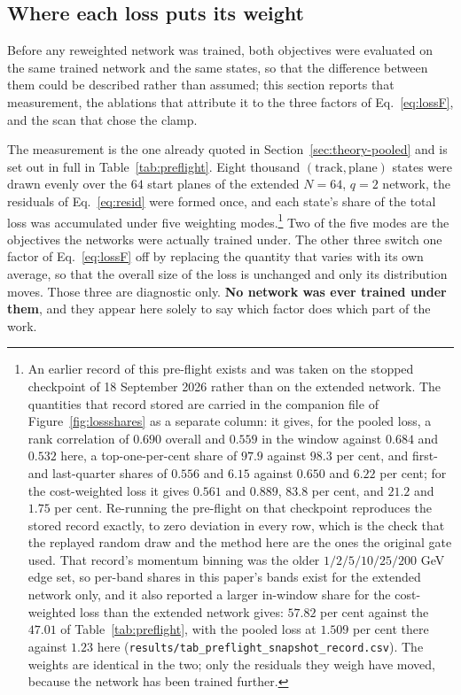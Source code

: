 \documentclass[11pt,a4paper]{article}
\begin{document}
\subsection{Where each loss puts its weight}
\label{sec:results-weight}

Before any reweighted network was trained, both objectives were evaluated on
the same trained network and the same states, so that the difference between
them could be described rather than assumed; this section reports that
measurement, the ablations that attribute it to the three factors of
Eq.~\eqref{eq:lossF}, and the scan that chose the clamp.

The measurement is the one already quoted in Section~\ref{sec:theory-pooled}
and is set out in full in Table~\ref{tab:preflight}. Eight thousand
$(\text{track}, \text{plane})$ states were drawn evenly over the $64$ start
planes of the extended $N = 64$, $q = 2$ network, the residuals of
Eq.~\eqref{eq:resid} were formed once, and each state's share of the total
loss was accumulated under five weighting modes.\footnote{An earlier record of
this pre-flight exists and was taken on the stopped checkpoint of 18 September
2026 rather than on the extended network. The quantities that record stored are
carried in the companion file of Figure~\ref{fig:lossshares} as a separate
column: it gives, for the pooled loss, a rank correlation of $0.690$ overall
and $0.559$ in the window against $0.684$ and $0.532$ here, a top-one-per-cent
share of $97.9$ against $98.3$ per cent, and first- and last-quarter shares of
$0.556$ and $6.15$ against $0.650$ and $6.22$ per cent; for the cost-weighted
loss it gives $0.561$ and $0.889$, $83.8$ per cent, and $21.2$ and $1.75$ per
cent. Re-running the pre-flight on that checkpoint reproduces the stored record
exactly, to zero deviation in every row, which is the check that the replayed
random draw and the method here are the ones the original gate used. That
record's momentum binning was the older $1/2/5/10/25/200$ GeV edge set, so
per-band shares in this paper's bands exist for the extended network only, and
it also reported a larger in-window share for the cost-weighted loss than the
extended network gives: $57.82$ per cent against the $47.01$ of
Table~\ref{tab:preflight}, with the pooled loss at $1.509$ per cent there
against $1.23$ here
(\texttt{results/tab\_preflight\_snapshot\_record.csv}). The weights are
identical in the two; only the residuals they weigh have moved, because the
network has been trained further.}
Two of the five modes are the objectives the networks were actually trained
under. The other three switch one factor of Eq.~\eqref{eq:lossF} off by
replacing the quantity that varies with its own average, so that the overall
size of the loss is unchanged and only its distribution moves. Those three are
diagnostic only. \textbf{No network was ever trained under them}, and they
appear here solely to say which factor does which part of the work.
\end{document}
